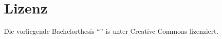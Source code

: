 \chapter*{Lizenz}

Die vorliegende Bachelorthesis \enquote{\thesisTitle{}} is unter Creative Commons  lizenziert.
